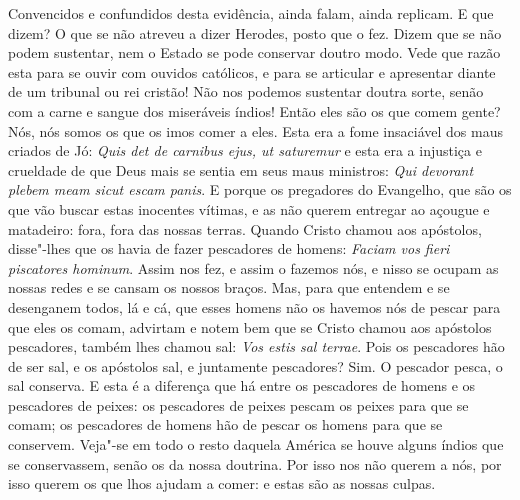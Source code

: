 Convencidos e confundidos desta evidência, ainda falam, ainda replicam.
E que dizem? O que se não atreveu a dizer Herodes, posto que o fez.
Dizem que se não podem sustentar, nem o Estado se pode conservar doutro
modo. Vede que razão esta para se ouvir com ouvidos católicos, e para se
articular e apresentar diante de um tribunal ou rei cristão! Não nos
podemos sustentar doutra sorte, senão com a carne e sangue dos
miseráveis índios! Então eles são os que comem gente? Nós, nós somos os
que os imos comer a eles. Esta era a fome insaciável dos maus criados de
Jó: \emph{Quis det de carnibus ejus, ut saturemur} e esta era a
injustiça e crueldade de que Deus mais se sentia em seus maus ministros:
\emph{Qui devorant plebem meam sicut escam panis}. E porque
os pregadores do Evangelho, que são os que vão buscar estas inocentes
vítimas, e as não querem entregar ao açougue e matadeiro: fora, fora das
nossas terras. Quando Cristo chamou aos apóstolos, disse"-lhes que os
havia de fazer pescadores de homens: \emph{Faciam vos fieri piscatores
hominum}. Assim nos fez, e assim o fazemos nós, e nisso se
ocupam as nossas redes e se cansam os nossos braços. Mas, para que
entendem e se desenganem todos, lá e cá, que esses homens não os havemos
nós de pescar para que eles os comam, advirtam e notem bem que se Cristo
chamou aos apóstolos pescadores, também lhes chamou sal: \emph{Vos estis
sal terrae}. Pois os pescadores hão de ser sal, e os
apóstolos sal, e juntamente pescadores? Sim. O pescador pesca, o sal
conserva. E esta é a diferença que há entre os pescadores de homens e os
pescadores de peixes: os pescadores de peixes pescam os peixes para que
se comam; os pescadores de homens hão de pescar os homens para que se
conservem. Veja"-se em todo o resto daquela América se houve alguns
índios que se conservassem, senão os da nossa doutrina. Por isso nos não
querem a nós, por isso querem os que lhos ajudam a comer: e estas são as
nossas culpas.

